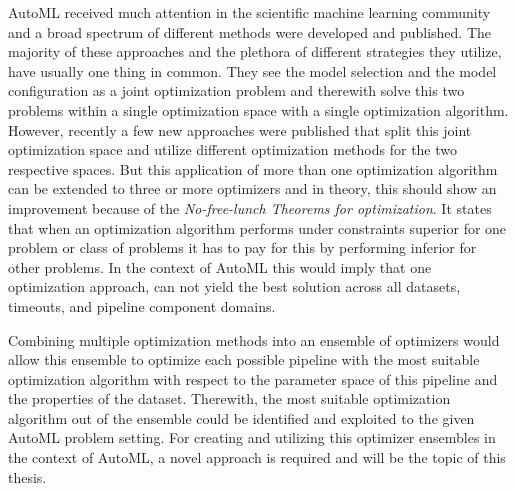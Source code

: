 AutoML received much attention in the scientific machine learning community and a broad spectrum of different methods were developed and published.
The majority of these approaches and the plethora of different strategies they utilize, have usually one thing in common.
They see the model selection and the model configuration as a joint optimization problem and therewith solve this two problems within a single optimization space with a single optimization algorithm.\newline
However, recently a few new approaches were published that split this joint optimization space and utilize different optimization methods for the two respective spaces.
But this application of more than one optimization algorithm can be extended to three or more optimizers and in theory, this should show an improvement because of the \textit{No-free-lunch Theorems for optimization}.
It states that when an optimization algorithm performs under constraints superior for one problem or class of problems it has to pay for this by performing inferior for other problems.
In the context of AutoML this would imply that one optimization approach, can not yield the best solution across all datasets, timeouts, and pipeline component domains.

Combining multiple optimization methods into an ensemble of optimizers would allow this ensemble to optimize each possible pipeline with the most suitable optimization algorithm with respect to the parameter space of this pipeline and the properties of the dataset.
Therewith, the most suitable optimization algorithm out of the ensemble could be identified and exploited to the given AutoML problem setting.\newline
For creating and utilizing this optimizer ensembles in the context of AutoML, a novel approach is required and will be the topic of this thesis. 

